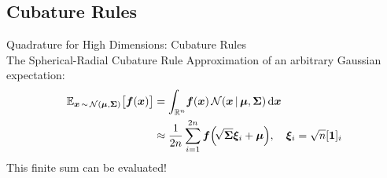\documentclass[
	aspectratio=43,
	color={accentcolor=1c},
	logo=false,
	colorframetitle=true
]{tudabeamer}
\begin{document}
		\subsection{Cubature Rules}
			\begin{frame}{Quadrature for High Dimensions: Cubature Rules \\ The Spherical-Radial Cubature Rule}
				Approximation of an arbitrary Gaussian expectation:
				\begin{align*}
					\mathbb{E}_{\bm{x} \,\sim\, \mathcal{N}(\bm{\mu}, \bm{\Sigma})}\big[ \bm{f}(\bm{x}) \big]
						&= \int_{\mathbb{R}^n} \! \bm{f}(\bm{x}) \, \mathcal{N}(\bm{x} \,\vert\, \bm{\mu}, \bm{\Sigma}) \dd{\bm{x}} \\
						&\approx \frac{1}{2n} \sum_{i = 1}^{2n} \bm{f}\Big(\! \sqrt{\bm{\Sigma}} \bm{\xi}_i + \bm{\mu} \Big),\quad \bm{\xi}_i = \sqrt{n} [\bm{1}]_i
				\end{align*}
				This finite sum can be evaluated!
			\end{frame}


\end{document}
